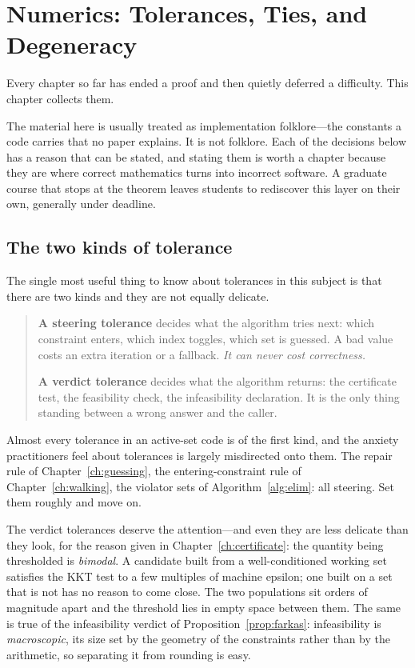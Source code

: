 \chapter{Numerics: Tolerances, Ties, and Degeneracy}
\label{ch:numerics}

Every chapter so far has ended a proof and then quietly deferred a difficulty. This
chapter collects them.

The material here is usually treated as implementation folklore---the constants a code
carries that no paper explains. It is not folklore. Each of the decisions below has a
reason that can be stated, and stating them is worth a chapter because they are where
correct mathematics turns into incorrect software. A graduate course that stops at the
theorem leaves students to rediscover this layer on their own, generally under
deadline.

\section{The two kinds of tolerance}

The single most useful thing to know about tolerances in this subject is that there are
two kinds and they are not equally delicate.

\begin{quote}
\textbf{A steering tolerance} decides what the algorithm tries next: which constraint
enters, which index toggles, which set is guessed. A bad value costs an extra iteration
or a fallback. \emph{It can never cost correctness.}

\textbf{A verdict tolerance} decides what the algorithm returns: the certificate test,
the feasibility check, the infeasibility declaration. It is the only thing standing
between a wrong answer and the caller.
\end{quote}

Almost every tolerance in an active-set code is of the first kind, and the anxiety
practitioners feel about tolerances is largely misdirected onto them. The repair rule
of Chapter~\ref{ch:guessing}, the entering-constraint rule of
Chapter~\ref{ch:walking}, the violator sets of Algorithm~\ref{alg:elim}: all steering.
Set them roughly and move on.

The verdict tolerances deserve the attention---and even they are less delicate than they
look, for the reason given in Chapter~\ref{ch:certificate}: the quantity being
thresholded is \emph{bimodal}. A candidate built from a well-conditioned working set
satisfies the KKT test to a few multiples of machine epsilon; one built on a set that
is not has no reason to come close. The two populations sit orders of magnitude apart
and the threshold lies in empty space between them. The same is true of the
infeasibility verdict of Proposition~\ref{prop:farkas}: infeasibility is
\emph{macroscopic}, its size set by the geometry of the constraints rather than by the
arithmetic, so separating it from rounding is easy.

